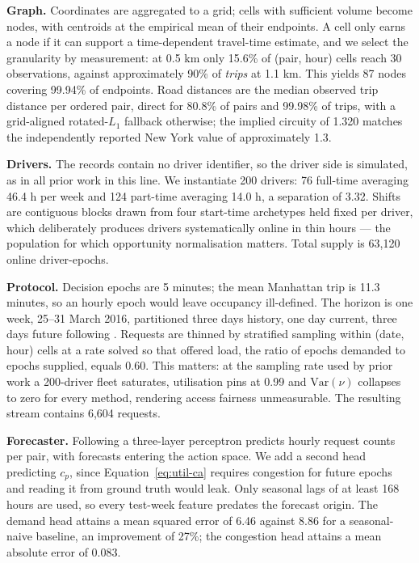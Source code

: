 \documentclass[10pt,twocolumn]{article}
\begin{document}
\textbf{Graph.} Coordinates are aggregated to a grid; cells with sufficient volume become nodes, with centroids at the empirical mean of their endpoints. A cell only earns a node if it can support a time-dependent travel-time estimate, and we select the granularity by measurement: at 0.5 km only 15.6\% of (pair, hour) cells reach 30 observations, against approximately 90\% of \emph{trips} at 1.1 km. This yields 87 nodes covering 99.94\% of endpoints. Road distances are the median observed trip distance per ordered pair, direct for 80.8\% of pairs and 99.98\% of trips, with a grid-aligned rotated-\(L_1\) fallback otherwise; the implied circuity of 1.320 matches the independently reported New York value of approximately 1.3.

\textbf{Drivers.} The records contain no driver identifier, so the driver side is simulated, as in all prior work in this line. We instantiate 200 drivers: 76 full-time averaging 46.4 h per week and 124 part-time averaging 14.0 h, a separation of 3.32. Shifts are contiguous blocks drawn from four start-time archetypes held fixed per driver, which deliberately produces drivers systematically online in thin hours --- the population for which opportunity normalisation matters. Total supply is 63{,}120 online driver-epochs.

\textbf{Protocol.} Decision epochs are 5 minutes; the mean Manhattan trip is 11.3 minutes, so an hourly epoch would leave occupancy ill-defined. The horizon is one week, 25--31 March 2016, partitioned three days history, one day current, three days future following \cite{kang2024}. Requests are thinned by stratified sampling within (date, hour) cells at a rate solved so that offered load, the ratio of epochs demanded to epochs supplied, equals 0.60. This matters: at the sampling rate used by prior work a 200-driver fleet saturates, utilisation pins at 0.99 and \(\mathrm{Var}(\nu)\) collapses to zero for every method, rendering access fairness unmeasurable. The resulting stream contains 6{,}604 requests.

\textbf{Forecaster.} Following \cite{kang2024} a three-layer perceptron predicts hourly request counts per pair, with forecasts entering the action space. We add a second head predicting \(c_p\), since Equation~\ref{eq:util-ca} requires congestion for future epochs and reading it from ground truth would leak. Only seasonal lags of at least 168 hours are used, so every test-week feature predates the forecast origin. The demand head attains a mean squared error of 6.46 against 8.86 for a seasonal-naive baseline, an improvement of 27\%; the congestion head attains a mean absolute error of 0.083.
\end{document}
